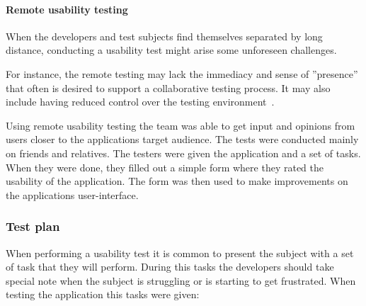\paragraph{Remote usability testing}
When the developers and test subjects find themselves separated by long distance, conducting a usability test might arise some unforeseen challenges.

For instance, the remote testing may lack the immediacy and sense of ''presence'' that often is desired to support a collaborative testing process. It may also include having reduced control over the testing environment~\cite{remoteTest}. 

Using remote usability testing the team was able to get input and opinions from users closer to the applications target audience.
The tests were conducted mainly on friends and relatives. The testers were given the application and a set of tasks. When they were done, they filled out a simple form where they rated the usability of the application. The form was then used to make improvements on the applications user-interface.

\subsubsection{Test plan}
When performing a usability test it is common to present the subject with a set of task that they will perform. During this tasks the developers should take special note when the subject is struggling or is starting to get frustrated. When testing the application this tasks were given:

